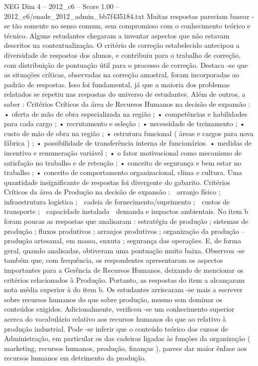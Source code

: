 \begin{textsample}{NEG Dim 4 – 2012\_c6 – Score 1.00 – 2012\_c6/enade\_2012\_admin\_bb7f435184.txt}
Muitas respostas pareciam basear -se tão somente no senso comum, sem compromisso com o conhecimento teórico e técnico.
Alguns estudantes chegaram a inventar aspectos que não estavam descritos na contextualização.
O critério de correção estabelecido antecipou a diversidade de respostas dos alunos, e contribuiu para o trabalho de correção, com distribuição de pontuação útil para o processo de correção.
Destaca -se que as situações críticas, observadas na correção amostral, foram incorporadas ao padrão de respostas.
Isso foi fundamental, já que a maioria dos problemas relatados se repetiu nas respostas do universo de estudantes.
Além de outros, a saber : Critérios Críticos da área de Recursos Humanos na decisão de expansão : • oferta de mão de obra especializada na região ; • competências e habilidades para cada cargo ; • recrutamento e seleção ; • necessidade de treinamento ; • custo de mão de obra na região ; • estrutura funcional ( áreas e cargos para nova fábrica ) ; • possibilidade de transferência interna de funcionários. • medidas de incentivo e remuneração variável ; • o fator motivacional como mecanismo de satisfação no trabalho e de retenção ; • conceito de segurança e bem estar no trabalho ; • conceito de comportamento organizacional, clima e cultura.
Uma quantidade insignificante de respostas foi divergente do gabarito.
Critérios Críticos da área de Produção na decisão de expansão :  arranjo físico ;  infraestrutura logística ;  cadeia de fornecimento/suprimento ;  custos de transporte ;  capacidade instalada  demanda e impactos ambientais.
No item b foram poucas as respostas que analisaram : estratégia de produção ; sistemas de produção ; fluxos produtivos ; arranjos produtivos ; organização da produção – produção artesanal, em massa, enxuta ; segurança das operações.
E, de forma geral, quando analisadas, obtiveram uma pontuação muito baixa.
Observou -se também que, com frequência, os respondentes apresentaram os aspectos importantes para a Gerência de Recursos Humanos, deixando de mencionar os critérios relacionados à Produção.
Portanto, as respostas do item a alcançaram nota média superior à do item b.
Os estudantes arriscaram -se mais a escrever sobre recursos humanos do que sobre produção, mesmo sem dominar os conteúdos exigidos.
Adicionalmente, verificou -se um conhecimento superior acerca do vocabulário relativo aos recursos humanos do que ao relativo à produção industrial.
Pode -se inferir que o conteúdo teórico dos cursos de Administração, em particular os das cadeiras ligadas às funções da organização ( marketing, recursos humanos, produção, finanças ), parece dar maior ênfase aos recursos humanos em detrimento da produção.

\end{textsample}
